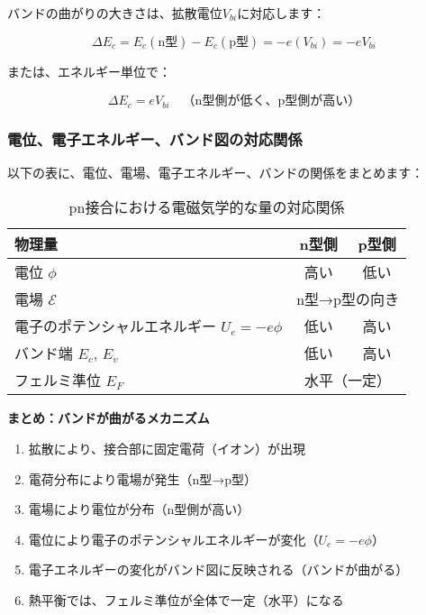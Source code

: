 バンドの曲がりの大きさは、拡散電位$V_{bi}$に対応します：

\begin{equation}
\Delta E_c = E_c(\text{n型}) - E_c(\text{p型}) = -e(V_{bi}) = -eV_{bi}
\end{equation}

または、エネルギー単位で：

\begin{equation}
\Delta E_c = eV_{bi} \quad \text{（n型側が低く、p型側が高い）}
\end{equation}

\subsubsection{電位、電子エネルギー、バンド図の対応関係}

以下の表に、電位、電場、電子エネルギー、バンドの関係をまとめます：

\begin{table}[H]
\centering
\caption{pn接合における電磁気学的な量の対応関係}
\begin{tabular}{|l|c|c|}
\hline
\textbf{物理量} & \textbf{n型側} & \textbf{p型側} \\
\hline
電位 $\phi$ & 高い & 低い \\
\hline
電場 $\mathcal{E}$ & \multicolumn{2}{c|}{n型→p型の向き} \\
\hline
電子のポテンシャルエネルギー $U_e = -e\phi$ & 低い & 高い \\
\hline
バンド端 $E_c$, $E_v$ & 低い & 高い \\
\hline
フェルミ準位 $E_F$ & \multicolumn{2}{c|}{水平（一定）} \\
\hline
\end{tabular}
\end{table}

\textbf{まとめ：バンドが曲がるメカニズム}

\begin{enumerate}
\item 拡散により、接合部に固定電荷（イオン）が出現
\item 電荷分布により電場が発生（n型→p型）
\item 電場により電位が分布（n型側が高い）
\item 電位により電子のポテンシャルエネルギーが変化（$U_e = -e\phi$）
\item 電子エネルギーの変化がバンド図に反映される（バンドが曲がる）
\item 熱平衡では、フェルミ準位が全体で一定（水平）になる
\end{enumerate}

